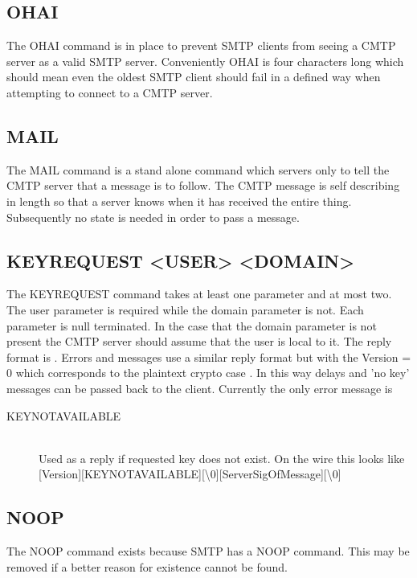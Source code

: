 \documentclass[a4paper,11pt]{article}
\begin{document}
\subsection{OHAI}
The OHAI command is in place to prevent SMTP clients from seeing a CMTP server as a valid SMTP server. Conveniently OHAI is four characters long which should mean even the oldest SMTP client should fail in a defined way when attempting to connect to a CMTP server.
\subsection{MAIL}
The MAIL command is a stand alone command which servers only to tell the CMTP server that a message is to follow. The CMTP message is self describing in length so that a server knows when it has received the entire thing. Subsequently no state is needed in order to pass a message.
\subsection{KEYREQUEST <USER> <DOMAIN>}
The KEYREQUEST command takes at least one parameter and at most two. The user parameter is required while the domain parameter is not. Each parameter is null terminated. In the case that the domain parameter is not present the CMTP server should assume that the user is local to it. The reply format is \newline
[Version][UserPublicKey][\textbackslash 0][ServerSigOfKey][\textbackslash 0]. \newline
Errors and messages use a similar reply format but with the Version = 0 which corresponds to the plaintext crypto case \newline
[Version][Message][\textbackslash 0][ServerSigOfMessage][\textbackslash 0]. \newline
In this way delays and 'no key' messages can be passed back to the client. Currently the only error message is
\begin{description}
  \item [KEYNOTAVAILABLE] \hfill \\
   Used as a reply if requested key does not exist. On the wire this looks like [Version][KEYNOTAVAILABLE][\textbackslash 0][ServerSigOfMessage][\textbackslash 0]
\end{description}
\subsection{NOOP}
The NOOP command exists because SMTP has a NOOP command. This may be removed if a better reason for existence cannot be found.
\end{document}
